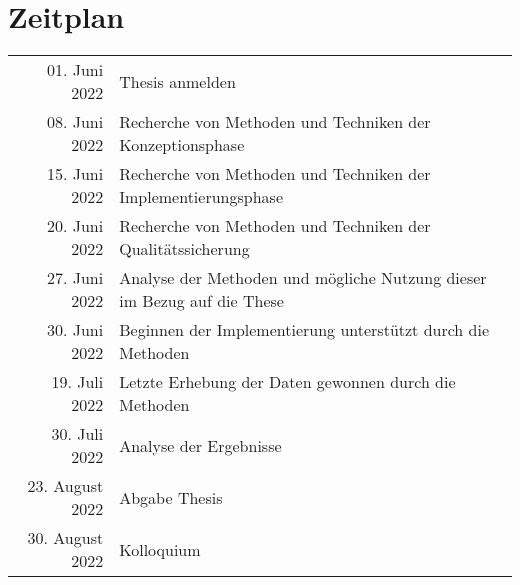 \section*{Zeitplan}

\bgroup
\def\arraystretch{2}
\setlength\tabcolsep{20pt}
\begin{tabular}{ rl } 
\hline
01. Juni 2022 & Thesis anmelden \\ 
08. Juni 2022 & Recherche von Methoden und Techniken der Konzeptionsphase \\ 
15. Juni 2022 & Recherche von Methoden und Techniken der Implementierungsphase \\ 
20. Juni 2022 & Recherche von Methoden und Techniken der Qualitätssicherung \\ 
27. Juni 2022 & Analyse der Methoden und mögliche Nutzung dieser im Bezug auf die These \\
30. Juni 2022 & Beginnen der Implementierung unterstützt durch die Methoden \\
19. Juli 2022 & Letzte Erhebung der Daten gewonnen durch die Methoden \\
30. Juli 2022 & Analyse der Ergebnisse \\
23. August 2022 & Abgabe Thesis \\
30. August 2022 & Kolloquium \\
\hline
\end{tabular}
\egroup
